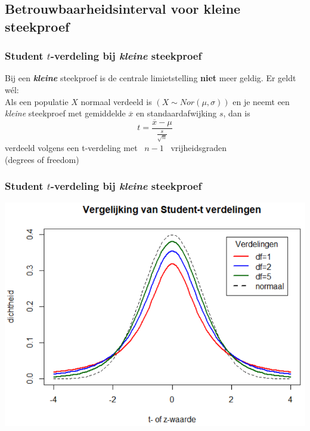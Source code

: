 \documentclass{beamer}
\begin{document}
\subsection{Betrouwbaarheidsinterval voor kleine steekproef}
\begin{frame}
  \frametitle{Student $t$-verdeling bij \textit{kleine} steekproef}
  Bij een \textit{\textbf{kleine}} steekproef is de centrale limietstelling \textbf{niet} meer geldig.
  \vfill
  Er geldt wél:\\
  \vfill
  Als een populatie $X$ normaal verdeeld is $(X \sim Nor(\mu,\sigma))$
  en je neemt een \textit{kleine} steekproef met gemiddelde $\overline{x}$ en standaardafwijking $s$,
  dan is
\[ t = \frac{\overline{x} - \mu}{\frac{s}{\sqrt{n}}} \]
verdeeld volgens een t-verdeling met ~$n-1$~ vrijheidsgraden\\
(degrees of freedom)

\end{frame}

\begin{frame}
  \frametitle{Student $t$-verdeling bij \textit{kleine} steekproef}
  \includegraphics[width=\linewidth]{img/les04-t-distrib}
\end{frame}
\end{document}
